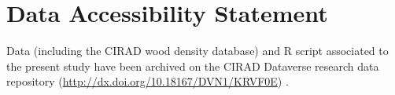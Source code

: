 \documentclass[a4paper, 12pt, leqno, dvipsnames]{article}\usepackage[]{graphicx}\usepackage[]{color}
\begin{document}
\section*{Data Accessibility Statement}

Data (including the CIRAD wood density database) and R script associated to the present study have been archived on the CIRAD Dataverse research data repository (\url{http://dx.doi.org/10.18167/DVN1/KRVF0E}) \citep{Vieilledent2017-CWDD}.


\newpage
\singlespacing

\renewcommand\refname{Literature Cited}
%
%
\end{document}
